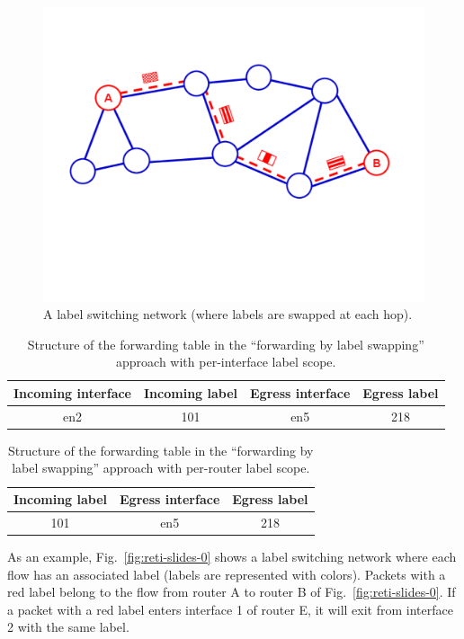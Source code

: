 \documentclass{article}
\begin{document}
\begin{figure}
\centering
 \includegraphics[trim=1cm 7cm 2cm 4cm, clip=true,width=0.7\columnwidth]{figures/reti-slides-1}
 \caption{A label switching network (where labels are swapped at each hop).}
 \label{fig:reti-slides-1}
\end{figure}




\begin{table}
 \centering
 \begin{tabular}{|c|c|c|c|}
 \hline
 \textbf{Incoming interface} & \textbf{Incoming label} & \textbf{Egress 
interface} &  \textbf{Egress label} \\
 \hline
 en2 & 101 & en5 & 218 \\
 \hline
 \end{tabular}
 \caption{Structure of the forwarding table in the ``forwarding by label 
swapping'' approach with per-interface label scope.}
 \label{tab:fib-label-interface}
\end{table}

\begin{table}
 \centering
 \begin{tabular}{|c|c|c|}
 \hline
 \textbf{Incoming label} & \textbf{Egress interface} &  \textbf{Egress label} \\
 \hline
 101 & en5 & 218 \\
 \hline
 \end{tabular}
 \caption{Structure of the forwarding table in the ``forwarding by label 
swapping'' approach with per-router label scope.}
 \label{tab:fib-label-router}
\end{table}

As an example, Fig.~\ref{fig:reti-slides-0} shows a label switching network 
where each flow has an associated label (labels are represented with colors). 
Packets with a red label belong to the flow from router A to router B of Fig.~\ref{fig:reti-slides-0}.
If a packet with a red label enters interface 1 of router E, it will exit from interface 2 with the same label.
\end{document}
